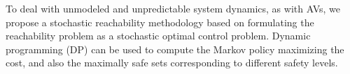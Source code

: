 To deal with unmodeled and unpredictable system dynamics, as with AVs, we propose a stochastic reachability methodology based on formulating the reachability problem as a stochastic optimal control problem. Dynamic programming (DP) can be used to compute the Markov policy maximizing the cost, and also the maximally safe sets corresponding to different safety levels. 



